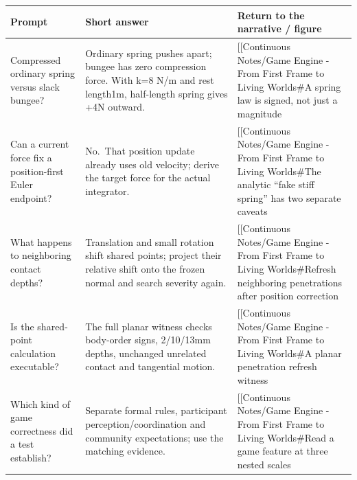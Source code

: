 {\def\LTcaptype{none} %
\begin{longtable}[]{@{}
  >{\raggedright\arraybackslash}p{}
  >{\raggedright\arraybackslash}p{}
  >{\raggedright\arraybackslash}p{}@{}}
\toprule\noalign{}
\begin{minipage}[b]{\linewidth}\raggedright
Prompt
\end{minipage} & \begin{minipage}[b]{\linewidth}\raggedright
Short answer
\end{minipage} & \begin{minipage}[b]{\linewidth}\raggedright
Return to the narrative / figure
\end{minipage} \\
\midrule\noalign{}
\endhead
\bottomrule\noalign{}
\endlastfoot
Compressed ordinary spring versus slack bungee? & Ordinary spring pushes apart; bungee has zero compression force. With k=8 N/m and rest length1m, half-length spring gives +4N outward. & {[}{[}Continuous Notes/Game Engine - From First Frame to Living Worlds\#A spring law is signed, not just a magnitude \\
Can a current force fix a position-first Euler endpoint? & No.~That position update already uses old velocity; derive the target force for the actual integrator. & {[}{[}Continuous Notes/Game Engine - From First Frame to Living Worlds\#The analytic ``fake stiff spring'' has two separate caveats \\
What happens to neighboring contact depths? & Translation and small rotation shift shared points; project their relative shift onto the frozen normal and search severity again. & {[}{[}Continuous Notes/Game Engine - From First Frame to Living Worlds\#Refresh neighboring penetrations after position correction \\
Is the shared-point calculation executable? & The full planar witness checks body-order signs, 2/10/13mm depths, unchanged unrelated contact and tangential motion. & {[}{[}Continuous Notes/Game Engine - From First Frame to Living Worlds\#A planar penetration refresh witness \\
Which kind of game correctness did a test establish? & Separate formal rules, participant perception/coordination and community expectations; use the matching evidence. & {[}{[}Continuous Notes/Game Engine - From First Frame to Living Worlds\#Read a game feature at three nested scales \\
\end{longtable}
}

